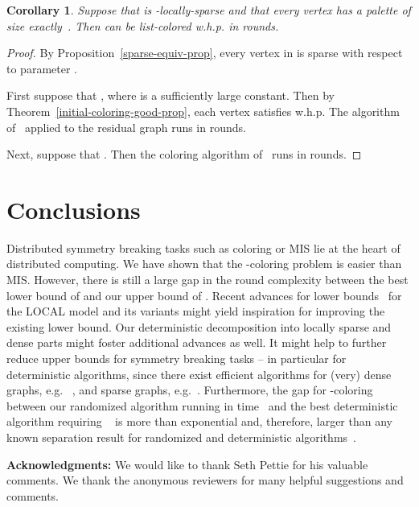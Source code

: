 \documentclass[11pt]{amsart}
\newtheorem{corollary}[theorem]{Corollary}
\begin{document}
\begin{corollary}
Suppose that  is -locally-sparse and that every vertex has a palette of size exactly~. Then  can be list-colored w.h.p. in  rounds.
\end{corollary}
\begin{proof}
By Proposition~\ref{sparse-equiv-prop}, every vertex in  is sparse with respect to parameter . 

First suppose that , where  is a sufficiently large constant. Then by Theorem~\ref{initial-coloring-good-prop}, each vertex satisfies  w.h.p. The algorithm of~\cite{elk15} applied to the residual graph runs in  rounds.

Next, suppose that . Then the coloring algorithm of~\cite{BEPS16} runs in  rounds.
\end{proof}

\section{Conclusions}
Distributed symmetry breaking tasks such as coloring or MIS lie at the heart of distributed computing. We have shown that the -coloring problem is easier than MIS. However, there is still a large gap in the round complexity between the best lower bound of  and our upper bound of . Recent advances for lower bounds~\cite{Brandt16, ChangP17, hef16, chlpj17} for the \textsf{LOCAL} model and its variants might yield inspiration for improving the existing lower bound. Our deterministic decomposition into locally sparse and dense parts might foster additional advances as well. It might help to further reduce upper bounds for symmetry breaking tasks -- in particular for deterministic algorithms, since there exist efficient algorithms for (very) dense graphs, e.g. ~\cite{sch10opt}, and sparse graphs, e.g.~\cite{moh17}. Furthermore, the gap for -coloring between our randomized algorithm running in time~ and the best deterministic algorithm requiring ~\cite{FraigniaudHK15} is more than exponential and, therefore, larger than any known separation result for randomized and deterministic algorithms~\cite{chan16}.

\medskip
\noindent \textbf{Acknowledgments:} We would like to thank Seth Pettie for his valuable comments. We thank the anonymous reviewers for many helpful suggestions and comments.



\end{document}
